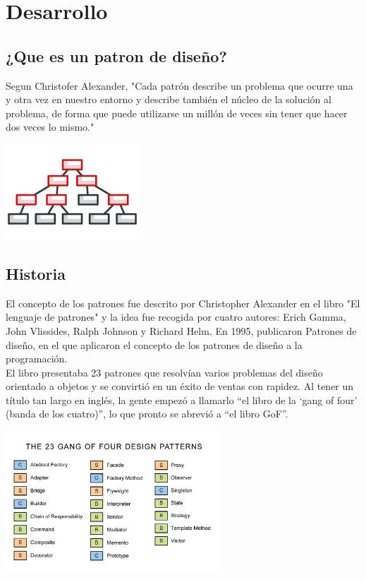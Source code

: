 \documentclass[twoside,twocolumn]{article}
\begin{document}
\section{Desarrollo}
\subsection{¿Que es un patron de diseño?}
Segun Christofer Alexander, "Cada patrón describe un problema que ocurre una y otra vez en nuestro
entorno y describe también el núcleo de la solución al problema, de forma que puede utilizarse un millón de veces sin tener que hacer dos veces lo mismo."

\begin{center}
	\includegraphics[width=5cm]{./imagenes/patrones.png} 
	\end{center}
\subsection{Historia}
El concepto de los patrones fue descrito por Christopher Alexander en el libro "El lenguaje de patrones" y la idea fue recogida por cuatro autores: Erich Gamma, John Vlissides, Ralph Johnson y Richard Helm. En 1995, publicaron Patrones de diseño, en el que aplicaron el concepto de los patrones de diseño a la programación.\\ El libro presentaba 23 patrones que resolvían varios problemas del diseño orientado a objetos y se convirtió en un éxito de ventas con rapidez. Al tener un título tan largo en inglés, la gente empezó a llamarlo “el libro de la ‘gang of four’ (banda de los cuatro)”, lo que pronto se abrevió a “el libro GoF”.
\begin{center}
	\includegraphics[width=8cm]{./imagenes/dp.jpg}
	\end{center}
\end{document}
